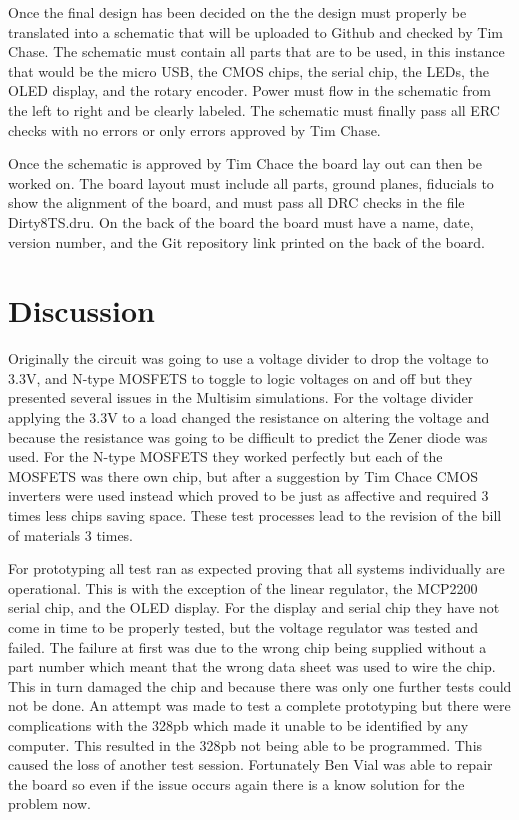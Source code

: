 \documentclass[12pt]{article}
\begin{document}
        \par Once the final design has been decided on the the design must properly be translated into a schematic that will be uploaded to Github and checked by Tim Chase. The schematic must contain all parts that are to be used, in this instance that would be the micro USB, the CMOS chips, the serial chip, the LEDs, the OLED display, and the rotary encoder. Power must flow in the schematic from the left to right and be clearly labeled. The schematic must finally pass all ERC checks with no errors or only errors approved by Tim Chase. 
        \par Once the schematic is approved by Tim Chace the board lay out can then be worked on. The board layout must include all parts, ground planes, fiducials to show the alignment of the board, and must pass all DRC checks in the file Dirty8TS.dru. On the back of the board the board must have a name, date, version number, and the Git repository link printed on the back of the board.


    \section{Discussion}
    Originally the circuit was going to use a voltage divider to drop the voltage to 3.3V, and N-type MOSFETS to toggle to logic voltages on and off but they presented several issues in the Multisim simulations. For the voltage divider applying the 3.3V to a load changed the resistance on altering the voltage and because the resistance was going to be difficult to predict the Zener diode was used. For the N-type MOSFETS they worked perfectly but each of the MOSFETS was there own chip, but after a suggestion by Tim Chace CMOS inverters were used instead which proved to be just as affective and required 3 times less chips saving space. These test processes lead to the revision of the bill of materials 3 times.
    \par For prototyping all test ran as expected proving that all systems individually are operational. This is with the exception of the linear regulator, the MCP2200 serial chip, and the OLED display.
    For the display and serial chip they have not come in time to be properly tested, but the voltage regulator was tested and failed. The failure at first was due to the wrong chip being supplied without a part number which meant that the wrong data sheet was used to wire the chip. This in turn damaged the chip and because there was only one further tests could not be done. An attempt was made to test a complete prototyping but there were complications with the 328pb which made it unable to be identified by any computer. This resulted in the 328pb not being able to be programmed. This caused the loss of another test session. Fortunately Ben Vial was able to repair the board so even if the issue occurs again there is a know solution for the problem now.
\end{document}
